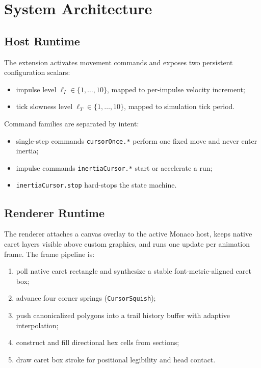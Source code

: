 \documentclass[journal]{IEEEtran}
\begin{document}
\section{System Architecture}

\subsection{Host Runtime}
The extension activates movement commands and exposes two persistent configuration scalars:
\begin{itemize}
	\item impulse level \(\ell_I \in \{1,\dots,10\}\), mapped to per-impulse velocity increment;
	\item tick slowness level \(\ell_T \in \{1,\dots,10\}\), mapped to simulation tick period.
\end{itemize}

Command families are separated by intent:
\begin{itemize}
	\item single-step commands \texttt{cursorOnce.*} perform one fixed move and never enter inertia;
	\item impulse commands \texttt{inertiaCursor.*} start or accelerate a run;
	\item \texttt{inertiaCursor.stop} hard-stops the state machine.
\end{itemize}

\subsection{Renderer Runtime}
The renderer attaches a canvas overlay to the active Monaco host, keeps native caret layers visible above custom graphics, and runs one update per animation frame. The frame pipeline is:
\begin{enumerate}
	\item poll native caret rectangle and synthesize a stable font-metric-aligned caret box;
	\item advance four corner springs (\texttt{CursorSquish});
	\item push canonicalized polygons into a trail history buffer with adaptive interpolation;
	\item construct and fill directional hex cells from sections;
	\item draw caret box stroke for positional legibility and head contact.
\end{enumerate}
\end{document}
